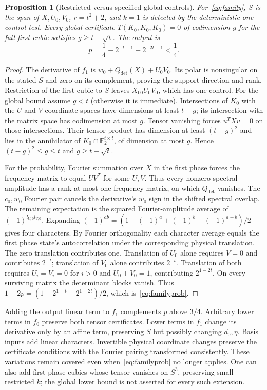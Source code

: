 \documentclass[11pt]{article}
\newtheorem{proposition}[theorem]{Proposition}
\newcommand{\F}{\mathbb F_2}
\begin{document}
\begin{proposition}[Restricted versus specified global controls]\label{prop:family}
For~\eqref{eq:family}, $S$ is the span of $X,U_0,V_0$, $r=t^2+2$, and $k=1$ is
detected by the deterministic one-control test. Every global certificate
$T(K_0,K_0,K_0)=0$ of codimension $g$ for the full first cubic satisfies
$g\geq t-\sqrt t$. The output is
\begin{equation}\label{eq:familyprob}
 p=\frac14-2^{-t-1}+2^{-2t-1}<\frac14.
\end{equation}
\end{proposition}
\begin{proof}
The derivative of $f_1$ is $w_0+Q_{\det}(X)+U_0V_0$. Its polar is nonsingular on
the stated $S$ and zero on its complement, proving the support direction and rank.
Restriction of the first cubic to $S$ leaves $X_{00}U_0V_0$, which has one control.
For the global bound assume $g<t$ (otherwise it is immediate). Intersections of
$K_0$ with the $U$ and $V$ coordinate spaces have dimensions at least $t-g$;
its intersection with the matrix space has codimension at most $g$. Tensor vanishing
forces $u^TXv=0$ on those intersections. Their tensor product has dimension at least
$(t-g)^2$ and lies in the annihilator of $K_0\cap\F^{t\times t}$, of dimension at
most $g$. Hence $(t-g)^2\leq g\leq t$ and $g\geq t-\sqrt t$.

For the probability, Fourier summation over $X$ in the first phase forces the
frequency matrix to equal $UV^T$ for some $U,V$. Thus every nonzero spectral
amplitude has a rank-at-most-one frequency matrix, on which $Q_{\det}$ vanishes.
The $c_0,w_0$ Fourier pair cancels the derivative's $w_0$ sign in the shifted
spectral overlap. The remaining expectation is the squared Fourier-amplitude
average of $(-1)^{l_{U,0}l_{V,0}}$. Expanding
$(-1)^{ab}=(1+(-1)^a+(-1)^b-(-1)^{a+b})/2$ gives four characters.
By Fourier orthogonality each character average equals the first phase state's
autocorrelation under the corresponding physical translation. The zero translation
contributes one. Translation of
$U_0$ alone requires $V=0$ and contributes $2^{-t}$; translation of $V_0$ alone
contributes $2^{-t}$. Translation of both requires $U_i=V_i=0$ for $i>0$ and
$U_0+V_0=1$, contributing $2^{1-2t}$. On every surviving matrix the determinant
blocks vanish. Thus $1-2p=(1+2^{1-t}-2^{1-2t})/2$, which is~\eqref{eq:familyprob}.
\end{proof}

Adding the output linear term to $f_1$ complements $p$ above $3/4$. Arbitrary lower
terms in $f_0$ preserve both tensor certificates. Lower terms in $f_1$ change its
derivative only by an affine term, preserving $S$ but possibly changing $d_0,\eta$.
Basis inputs add linear characters. Invertible physical coordinate changes preserve
the certificate conditions with the Fourier pairing transformed consistently.
These variations remain covered even when~\eqref{eq:familyprob} no longer applies.
One can also add first-phase cubics whose tensor vanishes on $S^3$, preserving small
restricted $k$; the global lower bound is not asserted for every such extension.
\end{document}
